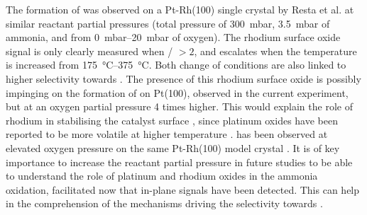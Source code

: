The formation of  was observed on a Pt-Rh(100) single crystal by Resta et al. \parencite*{Resta2020a} at similar reactant partial pressures (total pressure of \qty{300}{\milli\bar}, \qty{3.5}{\milli\bar} of ammonia, and from \qtyrange{0}{20}{\milli\bar} of oxygen).
The rhodium surface oxide signal is only clearly measured when / $>2$, and escalates when the temperature is increased from \qtyrange{175}{375}{\degreeCelsius}.
Both change of conditions are also linked to higher selectivity towards .
The presence of this rhodium surface oxide is possibly impinging on the formation of  on Pt(100), observed in the current experiment, but at an oxygen partial pressure \num{4} times higher.
This would explain the role of rhodium in stabilising the catalyst surface \parencite{Fierro1990, Fierro1992, Bergene1996}, since platinum oxides have been reported to be more volatile at higher temperature \parencite{Alcock1960}.
 has been observed at elevated oxygen pressure on the same Pt-Rh(100) model crystal \parencite{Westerstrom2008}.
It is of key importance to increase the reactant partial pressure in future studies to be able to understand the role of platinum and rhodium oxides in the ammonia oxidation, facilitated now that in-plane signals have been detected.
This can help in the comprehension of the mechanisms driving the selectivity towards .